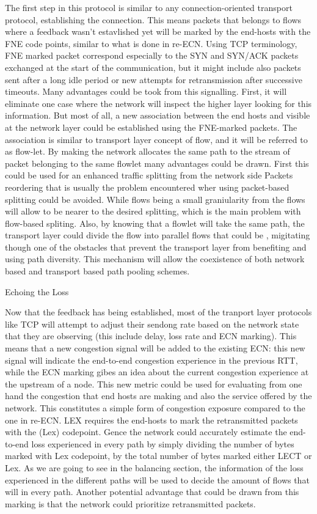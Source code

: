 The first step in this protocol is similar to any connection-oriented transport protocol, establishing the connection. This means packets that belongs to flows where a feedback wasn't estavlished yet will be marked by the end-hosts with the FNE code points, similar to what is done in re-ECN. Using TCP terminology, FNE marked packet correspond especially to the SYN and SYN/ACK packets exchanged at the start of the communication, but it might include also packets sent after a long idle period or new attempts for retransmission after successive timeouts. 
Many advantages could be took from this signalling. First, it will eliminate one case where the network will inspect the higher layer looking for this information. But most of all, a new association between the end hosts and visible at the network layer could be established using the FNE-marked packets. The association is similar to transport layer concept of flow, and it will be referred to as flow-let. By making the network allocates the same path to the stream of packet belonging to the same flowlet many advantages could be drawn. First this could be used for an enhanced traffic splitting from the network side Packets reordering that is usually the problem encountered wher using packet-based splitting could be avoided. While flows being a small graniularity from the flows will allow to be nearer to the desired splitting, which is the main problem with flow-based spliting. Also, by knowing that a flowlet will take the same path, the transport layer could divide the flow into parallel flows that could be , migitating though one of the obstacles that prevent the transport layer from benefiting and using path diversity. This mechanism will allow the coexistence of both network based and transport based path pooling schemes.

Echoing the Loss

Now that the feedback has being established, most of the tranport layer protocols like TCP will attempt to adjust their sendong rate based on the network state that they are observing (this include delay, loss rate and ECN marking). This means that a new congestion signal will be added to the existing ECN: this new signal will indicate the end-to-end congestion experience in the previous RTT, while the ECN marking gibes an idea about the current congestion experience at the upstream of a node. This new metric could be used for evaluating from one hand the congestion that end hosts are making and also the service offered by the network. This constitutes a simple form of congestion exposure compared to the one in re-ECN. LEX requires the end-hosts to mark the retransmitted packets with the (Lex) codepoint. Gence the network could accurately estimate the end-to-end loss experienced in every path by simply dividing the number of bytes marked with Lex codepoint,  by the total number of bytes marked either LECT or Lex. As we are going to see in the balancing section, the information of the loss experienced in the different paths will be used to decide the amount of flows that will in every path. Another potential advantage that could be drawn from this marking is that the network could prioritize retransmitted packets.

